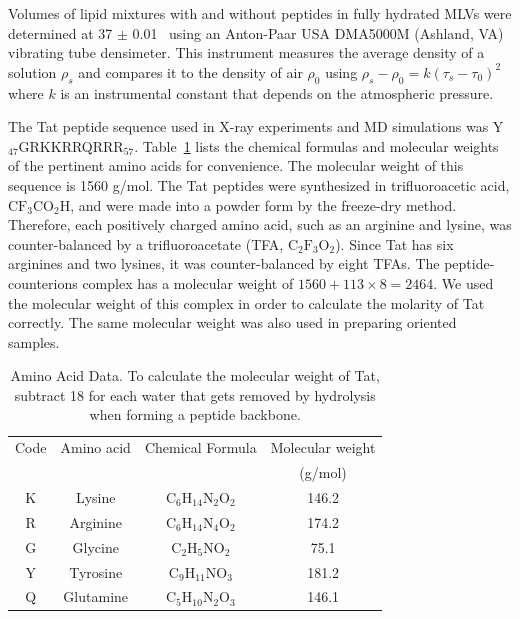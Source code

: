 Volumes of lipid mixtures with and without peptides in fully hydrated 
MLVs were determined at 37 $\pm$ 0.01 \textcelsius\ 
using an Anton-Paar USA DMA5000M (Ashland, VA) vibrating tube densimeter. 
This instrument measures the average density of a solution $\rho_s$
and compares it to
the density of air $\rho_0$ using $\rho_s-\rho_0=k(\tau_s-\tau_0)^2$ where $k$ is
an instrumental constant that depends on the atmospheric pressure. 

The Tat peptide sequence used in X-ray experiments and MD simulations was 
Y$_{47}$GRKKRRQRRR$_{57}$. Table~\ref{tab:aa} lists the chemical formulas and 
molecular weights of the pertinent amino acids for convenience. 
The molecular weight of this sequence is 1560 g/mol.
The Tat peptides were synthesized in trifluoroacetic acid, $\mathrm{CF_3CO_2H}$, 
and were made into a powder form by the 
freeze-dry method. Therefore, each positively charged amino acid, such as 
an arginine and lysine, was counter-balanced by a trifluoroacetate (TFA, 
$\mathrm{C_2F_3O_2}$). Since Tat has six arginines and two lysines, 
it was counter-balanced by eight TFAs. 
The peptide-counterions complex has a molecular weight of 
$1560+113\times 8=2464$. We used the 
molecular weight of this complex in order to calculate the molarity of Tat
correctly. The same molecular weight was also used in preparing oriented 
samples.

\begin{table}[htbp]
  \centering
  \begin{tabular}{c c c c}
    \hline
    Code & Amino acid & Chemical Formula & Molecular weight \\
    & & & (g/mol) \\
    \hline
    K & Lysine & $\mathrm{C_6H_{14}N_2O_2}$ & 146.2 \\
    R & Arginine & $\mathrm{C_6H_{14}N_4O_2}$ & 174.2 \\
    G & Glycine & $\mathrm{C_2H_5NO_2}$ & 75.1\\
    Y & Tyrosine & $\mathrm{C_9H_{11}NO_3}$ & 181.2 \\
    Q & Glutamine & $\mathrm{C_5H_{10}N_2O_3}$ & 146.1 \\ 
    \hline
  \end{tabular}
  \caption[Amino Acid Data]
  {Amino Acid Data. To calculate the molecular weight of Tat,
  subtract 18 for each water that gets removed by hydrolysis when
  forming a peptide backbone.}
  \label{tab:aa}
\end{table}

